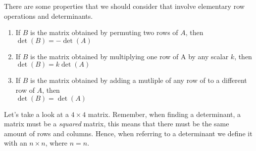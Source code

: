 There are some properties that we should consider that involve elementary row operations and determinants. 
\begin{enumerate}
    
    \item If $B$ is the matrix obtained by permuting two rows of $A$, then \\
    $\det(B) = -\det(A)$
    \item If $B$ is the matrix obtained by multiplying one row of A by any scalar $k$, then \\
    $\det(B) = k \det(A)$
    \item If $B$ is the matrix obtained by adding a mutliple of any row of to a different row of $A$, then \\
    $\det(B) = \det(A)$ 
\end{enumerate}
Let's take a look at a $ 4 \times 4$ matrix. Remember, when finding a determinant, a matrix must be a \textit{squared} matrix, this means that there must be the same amount of rows and columns. Hence, when referring to a determinant we define it with an $n \times n$, where $n = n$.
